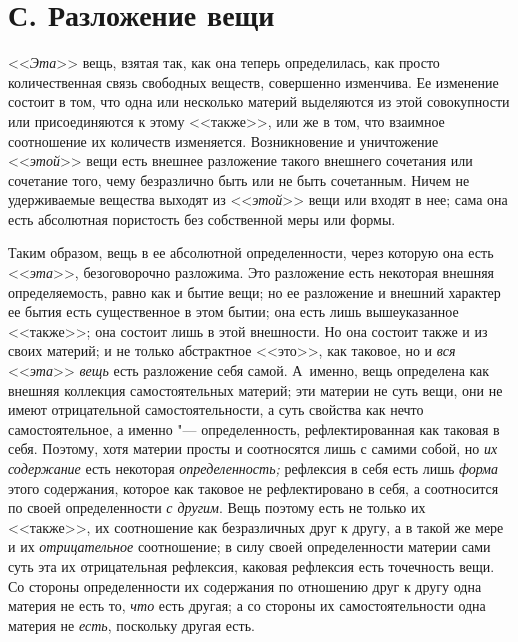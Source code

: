 \section[С. Разложение вещи]{С. Разложение вещи}

<<{\em Эта}>> вещь, взятая
так, как она теперь определилась, как просто количественная связь свободных
веществ, совершенно изменчива. Ее изменение состоит в том, что одна или
несколько материй выделяются из этой совокупности или присоединяются к
этому <<также>>, или же в том, что взаимное соотношение их количеств
изменяется. Возникновение и уничтожение <<{\em этой}>>
вещи есть внешнее разложение такого внешнего сочетания или сочетание того,
чему безразлично быть или не быть сочетанным. Ничем не удерживаемые
вещества выходят из <<{\em этой}>> вещи или входят в нее;
сама она есть абсолютная пористость без собственной меры или формы.

Таким образом, вещь в ее абсолютной определенности, через которую она есть
<<{\em эта}>>, безоговорочно разложима. Это разложение
есть некоторая внешняя определяемость, равно как и бытие вещи; но ее
разложение и внешний характер ее бытия есть существенное в этом бытии; она
есть лишь вышеуказанное <<также>>; она состоит лишь в этой внешности. Но она
состоит также и из своих материй; и не только абстрактное <<это>>, как
таковое, но и {\em вся}
<<{\em эта}>> {\em вещь} есть
разложение себя самой. А~именно, вещь определена как внешняя коллекция
самостоятельных материй; эти материи не суть вещи, они не имеют
отрицательной самостоятельности, а суть свойства как нечто самостоятельное,
а именно "--- определенность, рефлектированная как таковая в себя. Поэтому,
хотя материи просты и соотносятся лишь с самими собой, но
{\em их содержание} есть некоторая
{\em определенность;} рефлексия в себя есть лишь
{\em форма} этого содержания, которое как таковое не
рефлектировано в себя, а соотносится по своей определенности
{\em с другим}. Вещь поэтому есть не только их <<также>>,
их соотношение как безразличных друг к другу, а в такой же мере и их
{\em отрицательное} соотношение; в силу своей
определенности материи сами суть эта их отрицательная рефлексия, каковая
рефлексия есть точечность вещи. Со стороны определенности их содержания по
отношению друг к другу одна материя не есть то,
{\em что} есть другая; а со стороны их
самостоятельности одна материя не {\em есть}, поскольку другая есть.

